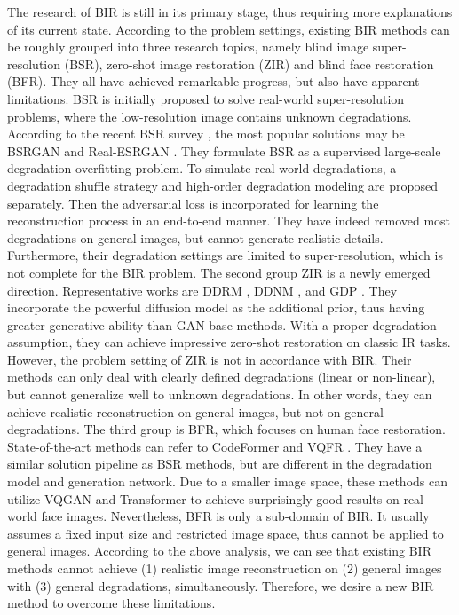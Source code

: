 \documentclass{article}
\begin{document}
The research of BIR is still in its primary stage, thus requiring more explanations of its current state. According to the problem settings, existing BIR methods can be roughly grouped into three research topics, namely blind image super-resolution (BSR), zero-shot image restoration (ZIR) and blind face restoration (BFR). They all have achieved remarkable progress, but also have apparent limitations. BSR is initially proposed to solve real-world super-resolution problems, where the low-resolution image contains unknown degradations. According to the recent BSR survey \cite{bsr_survey}, the most popular solutions may be BSRGAN \cite{bsrgan} and Real-ESRGAN \cite{realesrgan}. They formulate BSR as a supervised large-scale degradation overfitting problem. To simulate real-world degradations, a degradation shuffle strategy and high-order degradation modeling are proposed separately. Then the adversarial loss \cite{srgan, gans, esrgan, sngan, unetgan} is incorporated for learning the reconstruction process in an end-to-end manner. They have indeed removed most degradations on general images, but cannot generate realistic details. Furthermore, their degradation settings are limited to  super-resolution, which is not complete for the BIR problem. The second group ZIR is a newly emerged direction. Representative works are DDRM \cite{ddrm}, DDNM \cite{ddnm}, and GDP \cite{gdp}. They incorporate the powerful diffusion model as the additional prior, thus having greater generative ability than GAN-base methods. With a proper degradation assumption, they can achieve impressive zero-shot restoration on classic IR tasks. However, the problem setting of ZIR is not in accordance with BIR. Their methods can only deal with clearly defined degradations (linear or non-linear), but cannot generalize well to unknown degradations. In other words, they can achieve realistic reconstruction on general images, but not on general degradations. The third group is BFR, which focuses on human face restoration. State-of-the-art methods can refer to CodeFormer \cite{codeformer} and VQFR \cite{vqfr}. They have a similar solution pipeline as BSR methods, but are different in the degradation model and generation network. Due to a smaller image space, these methods can utilize VQGAN and Transformer to achieve surprisingly good results on real-world face images. Nevertheless, BFR is only a sub-domain of BIR. It usually assumes a fixed input size and restricted image space, thus cannot be applied to general images. According to the above analysis, we can see that existing BIR methods cannot achieve (1) realistic image reconstruction on (2) general images with (3) general degradations, simultaneously. Therefore, we desire a new BIR method to overcome these limitations. 
\end{document}
